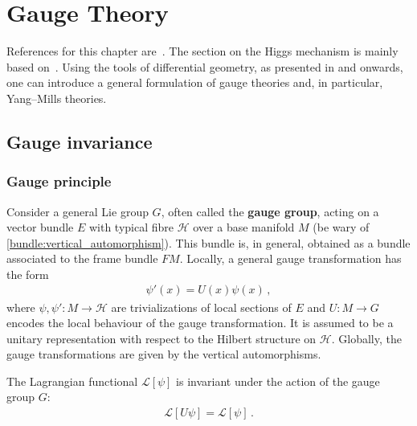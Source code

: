 \chapter{Gauge Theory}\label{chapter:gauge_theory}

    References for this chapter are~\citet{sontz_principal_2015,schuller_lectures_2016,nash_topology_2011,belgun_gauge_2024}. The section on the Higgs mechanism is mainly based on~\citet{choquet-bruhat_analysis_2000}. Using the tools of differential geometry, as presented in  and onwards, one can introduce a general formulation of gauge theories and, in particular, Yang--Mills theories.

    \minitoc

\section{Gauge invariance}
\subsection{Gauge principle}

    Consider a general Lie group $G$, often called the \textbf{gauge group}, acting on a vector bundle $E$ with typical fibre $\mathcal{H}$ over a base manifold $M$ (be wary of \cref{bundle:vertical_automorphism}). This bundle is, in general, obtained as a bundle associated to the frame bundle $FM$. Locally, a general gauge transformation has the form
    \begin{gather}
        \label{gauge:gauge_transformation}
        \psi'(x) = U(x)\psi(x)\,,
    \end{gather}
    where $\psi,\psi':M\rightarrow\mathcal{H}$ are trivializations of local sections of $E$ and $U:M\rightarrow G$ encodes the local behaviour of the gauge transformation. It is assumed to be a unitary representation with respect to the Hilbert structure on $\mathcal{H}$. Globally, the gauge transformations are given by the vertical automorphisms.

    \begin{axiom}
        The Lagrangian functional $\mathcal{L}[\psi]$ is invariant under the action of the gauge group $G$:
        \begin{gather}
            \mathcal{L}[U\psi] = \mathcal{L}[\psi]\,.
        \end{gather}
    \end{axiom}

